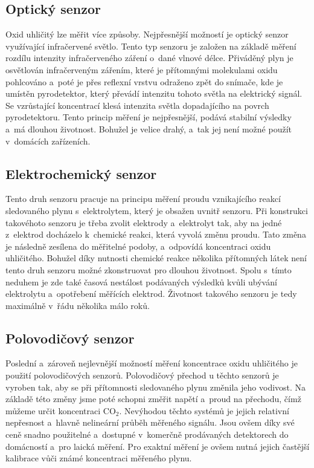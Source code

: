 \subsection{Optický senzor}

Oxid uhličitý lze měřit více způsoby. Nejpřesnější možností je optický senzor využívající infračervené světlo. Tento typ senzoru je založen na základě měření rozdílu intenzity infračerveného záření o~dané vlnové délce. Přiváděný plyn je osvětlován infračerveným zářením, které je přítomnými molekulami oxidu pohlcováno a~poté je přes reflexní vrstvu odraženo zpět do snímače, kde je umístěn pyrodetektor, který převádí intenzitu tohoto světla na elektrický signál. Se vzrůstající koncentrací klesá intenzita světla dopadajícího na povrch pyrodetektoru. Tento princip měření je nejpřesnější, podává stabilní výsledky a~má dlouhou životnost. Bohužel je velice drahý, a~tak jej není možné použít v~domácích zařízeních. \cite{teor_COMeas}

\subsection{Elektrochemický senzor}

Tento druh senzoru pracuje na principu měření proudu vznikajícího reakcí sledovaného plynu s~elektrolytem, který je obsažen uvnitř senzoru. Při konstrukci takovéhoto senzoru je třeba zvolit elektrody a~elektrolyt tak, aby na jedné z~elektrod docházelo k~chemické reakci, která vyvolá změnu proudu. Tato změna je následně zesílena do měřitelné podoby, a~odpovídá koncentraci oxidu uhličitého. Bohužel díky nutnosti chemické reakce několika přítomných látek není tento druh senzoru možné zkonstruovat pro dlouhou životnost. Spolu s~tímto neduhem je zde také časová nestálost podávaných výsledků kvůli ubývání elektrolytu a~opotřebení měřících elektrod. Životnost takového senzoru je tedy maximálně v~řádu několika málo roků. \cite{teor_COMeas}

\subsection{Polovodičový senzor}

Poslední a~zároveň nejlevnější možností měření koncentrace oxidu uhličitého je použití polovodičových senzorů. Polovodičový přechod u těchto senzorů je vyroben tak, aby se při přítomnosti sledovaného plynu změnila jeho vodivost. Na základě této změny jsme poté schopni změřit napětí a~proud na přechodu, čímž můžeme určit koncentraci CO$_2$. Nevýhodou těchto systémů je jejich relativní nepřesnost a~hlavně nelineární průběh měřeného signálu. Jsou ovšem díky své ceně snadno použitelné a~dostupné v~komerčně prodávaných detektorech do domácností a~pro laická měření. Pro exaktní měření je ovšem nutná jejich častější kalibrace vůči známé koncentraci měřeného plynu. \cite{teor_COMeas}

